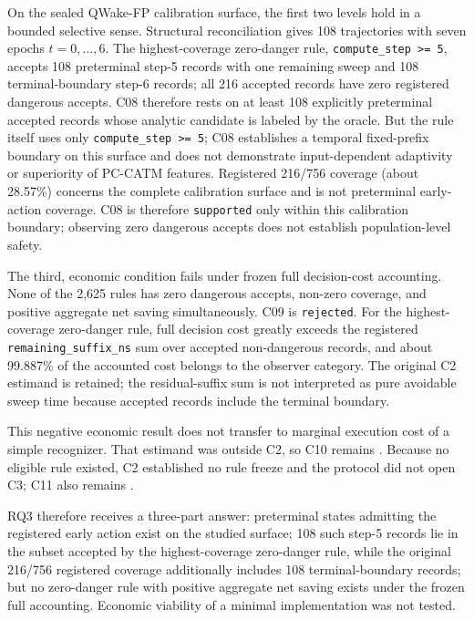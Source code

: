 On the sealed QWake-FP calibration surface, the first two levels hold in a bounded
selective sense. Structural reconciliation gives 108 trajectories with seven epochs
\(t=0,\ldots,6\). The highest-coverage zero-danger rule,
\texttt{compute\_step >= 5}, accepts 108 preterminal step-5 records with one remaining
sweep and 108 terminal-boundary step-6 records; all 216 accepted records have zero
registered dangerous accepts. C08 therefore rests on at least 108 explicitly
preterminal accepted records whose analytic candidate is labeled
 by the oracle. But the rule itself uses only
\texttt{compute\_step >= 5}; C08 establishes a temporal fixed-prefix boundary on this
surface and does not demonstrate input-dependent adaptivity or superiority of
PC-CATM features. Registered 216/756 coverage (about 28.57\%) concerns the complete
calibration surface and is not preterminal early-action coverage. C08 is therefore
\texttt{supported} only within this calibration boundary; observing zero dangerous
accepts does not establish population-level safety.

The third, economic condition fails under frozen full decision-cost accounting. None
of the 2,625 rules has zero dangerous accepts, non-zero coverage, and positive
aggregate net saving simultaneously. C09 is \texttt{rejected}. For the highest-
coverage zero-danger rule, full decision cost greatly exceeds the registered
\texttt{remaining\_suffix\_ns} sum over accepted non-dangerous records, and about
99.887\% of the accounted cost belongs to the observer category. The original C2
estimand is retained; the residual-suffix sum is not interpreted as pure avoidable
sweep time because accepted records include the terminal boundary.

This negative economic result does not transfer to marginal execution cost of a simple
recognizer. That estimand was outside C2, so C10 remains . Because
no eligible rule existed, C2 established no rule freeze and the protocol did not open
C3; C11 also remains .

RQ3 therefore receives a three-part answer: preterminal states admitting the
registered early action exist on the studied surface; 108 such step-5 records lie in
the subset accepted by the highest-coverage zero-danger rule, while the original
216/756 registered coverage additionally includes 108 terminal-boundary records; but
no zero-danger rule with positive aggregate net saving exists under the frozen full
accounting. Economic viability of a minimal implementation was not tested.

